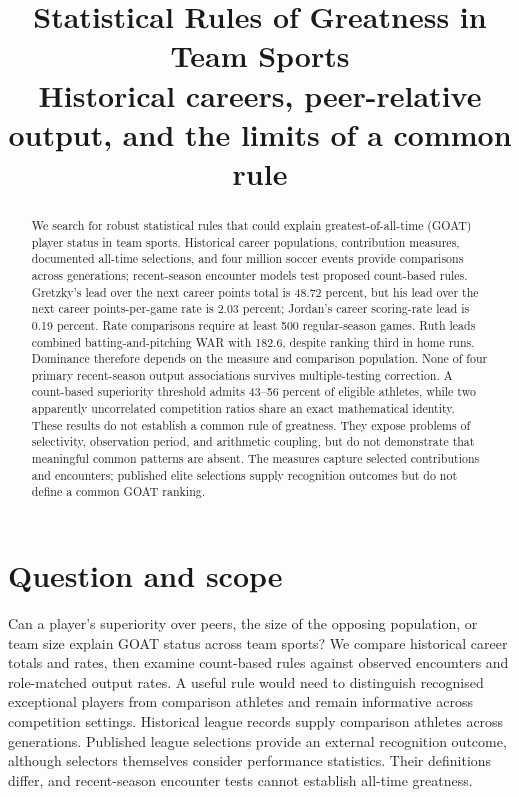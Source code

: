 \documentclass[11pt,letterpaper]{article}
\title{Statistical Rules of Greatness in Team Sports\\
\large Historical careers, peer-relative output, and the limits of a common rule}
\author{}
\date{}
\begin{document}
\maketitle
\vspace{-1.5em}
\begin{abstract}
We search for robust statistical rules that could explain greatest-of-all-time (GOAT) player status in team sports.
Historical career populations, contribution measures, documented all-time selections, and four million soccer events provide comparisons across generations; recent-season encounter models test proposed count-based rules.
Gretzky's lead over the next career points total is 48.72 percent, but his lead over the next career points-per-game rate is 2.03 percent; Jordan's career scoring-rate lead is 0.19 percent.
Rate comparisons require at least 500 regular-season games.
Ruth leads combined batting-and-pitching WAR with 182.6, despite ranking third in home runs.
Dominance therefore depends on the measure and comparison population.
None of four primary recent-season output associations survives multiple-testing correction.
A count-based superiority threshold admits 43--56 percent of eligible athletes, while two apparently uncorrelated competition ratios share an exact mathematical identity.
These results do not establish a common rule of greatness.
They expose problems of selectivity, observation period, and arithmetic coupling, but do not demonstrate that meaningful common patterns are absent.
The measures capture selected contributions and encounters; published elite selections supply recognition outcomes but do not define a common GOAT ranking.
\end{abstract}

\section{Question and scope}

Can a player's superiority over peers, the size of the opposing population, or team size explain GOAT status across team sports?
We compare historical career totals and rates, then examine count-based rules against observed encounters and role-matched output rates.
A useful rule would need to distinguish recognised exceptional players from comparison athletes and remain informative across competition settings.
Historical league records supply comparison athletes across generations.
Published league selections provide an external recognition outcome, although selectors themselves consider performance statistics.
Their definitions differ, and recent-season encounter tests cannot establish all-time greatness.
\end{document}
